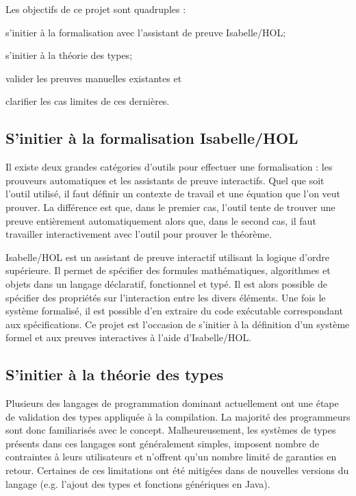 \documentclass[a4paper, oneside, 12pt, titlepage]{article}
\begin{document}

Les objectifs de ce projet sont quadruples :
\begin{enumerate*}[label=\arabic*)]
  \item s'initier à la formalisation avec l'assistant de preuve Isabelle/HOL;
  \item s'initier à la théorie des types;
  \item valider les preuves manuelles existantes et
  \item clarifier les cas limites de ces dernières.
\end{enumerate*}

\subsection{S'initier à la formalisation Isabelle/HOL}

Il existe deux grandes catégories d'outils pour effectuer une formalisation : les prouveurs
automatiques et les assistants de preuve interactifs. Quel que soit l'outil utilisé, il faut définir
un contexte de travail et une équation que l'on veut prouver. La différence est que, dans le premier
cas, l'outil tente de trouver une preuve entièrement automatiquement alors que, dans le second
cas, il faut travailler interactivement avec l'outil pour prouver le théorème.

Isabelle/HOL est un assistant de preuve interactif utilisant la logique d'ordre supérieure. Il
permet de spécifier des formules mathématiques, algorithmes et objets dans un langage déclaratif,
fonctionnel et typé. Il est alors possible de spécifier des propriétés sur l'interaction entre les
divers éléments. Une fois le système formalisé, il est possible d'en extraire du code exécutable
correspondant aux spécifications. Ce projet est l'occasion de s'initier à la définition d'un
système formel et aux preuves interactives à l'aide d'Isabelle/HOL.

\subsection{S'initier à la théorie des types}

Plusieurs des langages de programmation dominant actuellement ont une étape de validation des types
appliquée à la compilation. La majorité des programmeurs sont donc familiarisés avec le concept.
Malheureusement, les systèmes de types présents dans ces langages sont généralement simples,
imposent nombre de contraintes à leurs utilisateurs et n'offrent qu'un nombre limité de garanties en
retour. Certaines de ces limitations ont été mitigées dans de nouvelles versions du langage (e.g.
l'ajout des types et fonctions génériques en Java).
\end{document}
